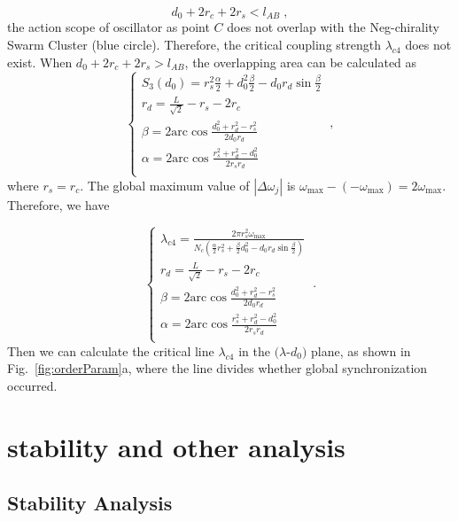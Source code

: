 \documentclass[%
 aip,
 amsmath,amssymb,
 reprint,%
]{revtex4-1}
\begin{document}
\begin{equation}
    d_0+2r_c+2r_s<l_{AB}\;,
\end{equation}
the action scope of oscillator as point $C$ does not overlap with the Neg-chirality Swarm Cluster (blue circle). Therefore, the critical coupling strength $\lambda_{c4}$ does not exist. When $d_0+2r_c+2r_s>l_{AB}$, the overlapping area can be calculated as
\begin{equation}
    \begin{cases}
        S_3\left( d_0 \right) =r_{s}^{2}\frac{\alpha}{2}+d_{0}^{2}\frac{\beta}{2}-d_0r_d\sin \frac{\beta}{2}\\
        r_d=\frac{L}{\sqrt{2}}-r_s-2r_c\\
        \beta =2\mathrm{arc}\cos \frac{d_{0}^{2}+r_{d}^{2}-r_{s}^{2}}{2d_0r_d}\\
        \alpha =2\mathrm{arc}\cos \frac{r_{s}^{2}+r_{d}^{2}-d_{0}^{2}}{2r_sr_d}\\
    \end{cases}\;,
\end{equation}
where $r_s=r_c$. The global maximum value of $\left| \Delta \omega _j \right|$ is $\omega _{\max}-\left( -\omega _{\max} \right) =2\omega _{\max}$. Therefore, we have

\begin{equation}
    \begin{cases}
        \lambda _{c4}=\frac{2\pi r_{s}^{2}\omega _{\max}}{N_c\left( \frac{\alpha}{2}r_{s}^{2}+\frac{\beta}{2}d_{0}^{2}-d_0r_d\sin \frac{\beta}{2} \right)}\\
        r_d=\frac{L}{\sqrt{2}}-r_s-2r_c\\
        \beta =2\mathrm{arc}\cos \frac{d_{0}^{2}+r_{d}^{2}-r_{s}^{2}}{2d_0r_d}\\
        \alpha =2\mathrm{arc}\cos \frac{r_{s}^{2}+r_{d}^{2}-d_{0}^{2}}{2r_sr_d}\\
    \end{cases}\;.
\end{equation}
Then we can calculate the critical line $\lambda_{c4}$ in the $(\lambda$-$d_0)$ plane, as shown in Fig.~\ref{fig:orderParam}a, where the line divides whether global synchronization occurred.

\section{stability and other analysis}

\subsection{Stability Analysis}
\end{document}

